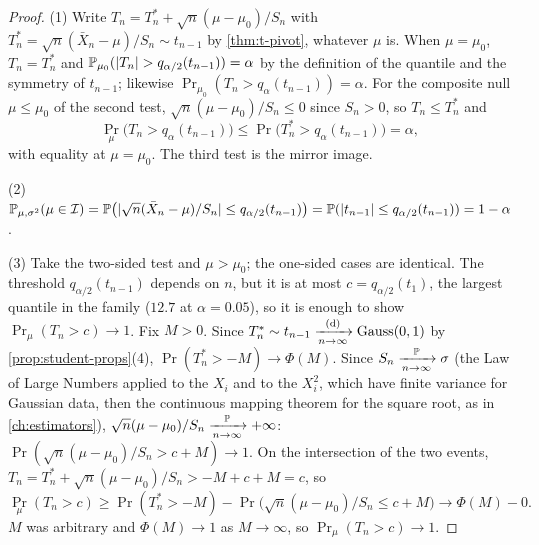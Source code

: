 \begin{proof}
(1) Write $T_n = T_n^* + \sqrt{n}(\mu - \mu_0)/S_n$ with $T_n^* = \sqrt{n}(\bar{X}_n - \mu)/S_n \sim t_{n-1}$ by \cref{thm:t-pivot}, whatever $\mu$ is.
When $\mu = \mu_0$, $T_n = T_n^*$ and $\mathbb{P}_{\mu_0}(\lvert T_n\rvert > q_{\alpha/2}(t_{n-1})) = \alpha$ by the definition of the quantile and the symmetry of $t_{n-1}$; likewise $\Pr_{\mu_0}(T_n > q_\alpha(t_{n-1})) = \alpha$.
For the composite null $\mu \leq \mu_0$ of the second test, $\sqrt{n}(\mu - \mu_0)/S_n \leq 0$ since $S_n > 0$, so $T_n \leq T_n^*$ and
\[
\Pr_\mu\big(T_n > q_\alpha(t_{n-1})\big) \leq \Pr\big(T_n^* > q_\alpha(t_{n-1})\big) = \alpha,
\]
with equality at $\mu = \mu_0$.
The third test is the mirror image.

(2) $\mathbb{P}_{\mu,\sigma^2}(\mu \in \mathcal{I}) = \mathbb{P}\big(\lvert\sqrt{n}(\bar{X}_n - \mu)/S_n\rvert \leq q_{\alpha/2}(t_{n-1})\big) = \mathbb{P}(\lvert t_{n-1}\rvert \leq q_{\alpha/2}(t_{n-1})) = 1 - \alpha$.

(3) Take the two-sided test and $\mu > \mu_0$; the one-sided cases are identical.
The threshold $q_{\alpha/2}(t_{n-1})$ depends on $n$, but it is at most $c = q_{\alpha/2}(t_1)$, the largest quantile in the family ($12.7$ at $\alpha = 0.05$), so it is enough to show $\Pr_\mu(T_n > c) \to 1$.
Fix $M > 0$.
Since $T_n^* \sim t_{n-1} \xrightarrow [n \to \infty ]{\text{(d)}} \text{Gauss}(0,1)$ by \cref{prop:student-props}(4), $\Pr(T_n^* > -M) \to \Phi(M)$.
Since $S_n \xrightarrow [n \to \infty ]{\mathbb{P}} \sigma$ (the Law of Large Numbers applied to the $X_i$ and to the $X_i^2$, which have finite variance for Gaussian data, then the continuous mapping theorem for the square root, as in \cref{ch:estimators}), $\sqrt{n}(\mu - \mu_0)/S_n \xrightarrow [n \to \infty ]{\mathbb{P}} +\infty$: $\Pr(\sqrt{n}(\mu - \mu_0)/S_n > c + M) \to 1$.
On the intersection of the two events, $T_n = T_n^* + \sqrt{n}(\mu - \mu_0)/S_n > -M + c + M = c$, so
\[
\Pr_\mu(T_n > c) \geq \Pr(T_n^* > -M) - \Pr\big(\sqrt{n}(\mu - \mu_0)/S_n \leq c + M\big) \to \Phi(M) - 0.
\]
$M$ was arbitrary and $\Phi(M) \to 1$ as $M \to \infty$, so $\Pr_\mu(T_n > c) \to 1$.
\end{proof}

